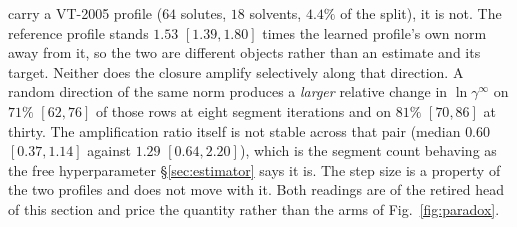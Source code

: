 carry a VT-2005 profile ($64$ solutes, $18$ solvents, $4.4\%$ of the split), it is not. The
reference profile stands $1.53$ $[1.39,1.80]$ times the learned profile's own norm away from it, so
the two are different objects rather than an estimate and its target. Neither does the closure amplify
selectively along that direction. A random direction of the same norm produces a \emph{larger}
relative change in $\ln\gamma^\infty$ on $71\%$ $[62,76]$ of those rows at eight segment iterations
and on $81\%$ $[70,86]$ at thirty. The amplification ratio itself is not stable across that pair
(median $0.60$ $[0.37,1.14]$ against $1.29$ $[0.64,2.20]$), which is the segment count behaving as
the free hyperparameter \S\ref{sec:estimator} says it is. The step size is a property of the two
profiles and does not move with it. Both readings are of the retired head of this section and price
the quantity rather than the arms of Fig.~\ref{fig:paradox}.

\clearpage
